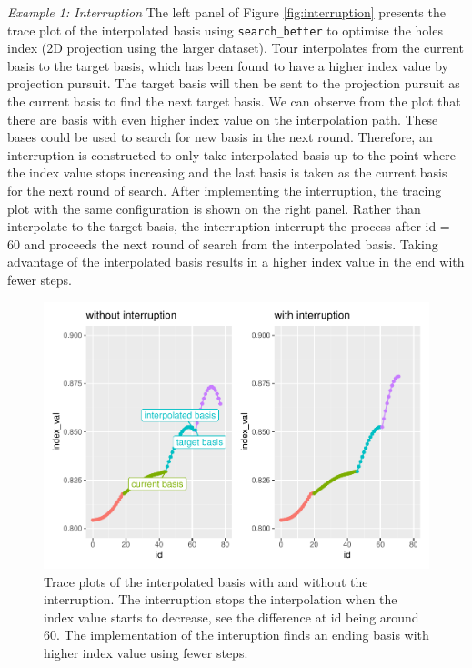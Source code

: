 \documentclass[12pt]{article}
\begin{document}
\emph{Example 1: Interruption} The left panel of Figure
\ref{fig:interruption} presents the trace plot of the interpolated basis
using \texttt{search\_better} to optimise the holes index (2D projection
using the larger dataset). Tour interpolates from the current basis to
the target basis, which has been found to have a higher index value by
projection pursuit. The target basis will then be sent to the projection
pursuit as the current basis to find the next target basis. We can
observe from the plot that there are basis with even higher index value
on the interpolation path. These bases could be used to search for new
basis in the next round. Therefore, an interruption is constructed to
only take interpolated basis up to the point where the index value stops
increasing and the last basis is taken as the current basis for the next
round of search. After implementing the interruption, the tracing plot
with the same configuration is shown on the right panel. Rather than
interpolate to the target basis, the interruption interrupt the process
after id = 60 and proceeds the next round of search from the
interpolated basis. Taking advantage of the interpolated basis results
in a higher index value in the end with fewer steps.

\begin{figure}
\centering
\includegraphics{paper_files/figure-latex/interruption-1.pdf}
\caption{\label{interruption}Trace plots of the interpolated basis with
and without the interruption. The interruption stops the interpolation
when the index value starts to decrease, see the difference at id being
around 60. The implementation of the interuption finds an ending basis
with higher index value using fewer steps.}
\end{figure}
\end{document}
